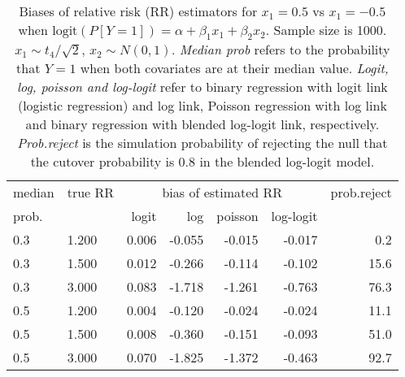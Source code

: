 \documentclass[12pt,a4paper]{article}
\begin{document}
\begin{table}[H] 
\small\sf\centering 
\caption{Biases of relative risk (RR) estimators for $x_1=0.5$ vs $x_1=-0.5$ when $\mbox{logit}(P[Y=1])=\alpha+\beta_1 x_1 + \beta_2 x_2$. Sample size is 1000. $x_1 \sim $$t_4/\sqrt{2}$, $x_2 \sim N(0,1)$. {\it Median prob} refers to the probability that $Y=1$ when both covariates are at their median value. {\it Logit, log, poisson and log-logit} refer to binary regression with logit link (logistic regression) and log link, Poisson regression with log link and binary regression with blended log-logit link, respectively. {\it Prob.reject} is the simulation probability of rejecting the null that the cutover probability is $0.8$ in the blended log-logit model.} 
\begin{tabular}{llrrrrr} 
\toprule 
median & true RR & \multicolumn{4}{c}{bias of estimated RR} & prob.reject \\ 
prob. & & logit & log & poisson & log-logit  & \\ \midrule 
0.3 & 1.200 & 0.006 & -0.055 & -0.015 & -0.017 &  0.2 \\  
0.3 & 1.500 & 0.012 & -0.266 & -0.114 & -0.102 & 15.6 \\  
0.3 & 3.000 & 0.083 & -1.718 & -1.261 & -0.763 & 76.3 \\  
0.5 & 1.200 & 0.004 & -0.120 & -0.024 & -0.024 & 11.1 \\  
0.5 & 1.500 & 0.008 & -0.360 & -0.151 & -0.093 & 51.0 \\  
0.5 & 3.000 & 0.070 & -1.825 & -1.372 & -0.463 & 92.7 \\  
\bottomrule 
\end{tabular} 
\end{table} 
\end{document}
